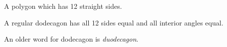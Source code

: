 A polygon which has 12 straight sides.
\par
A regular dodecagon has all 12 sides equal and all interior angles equal.
\par
An older word for dodecagon is \emph{duodecagon}.